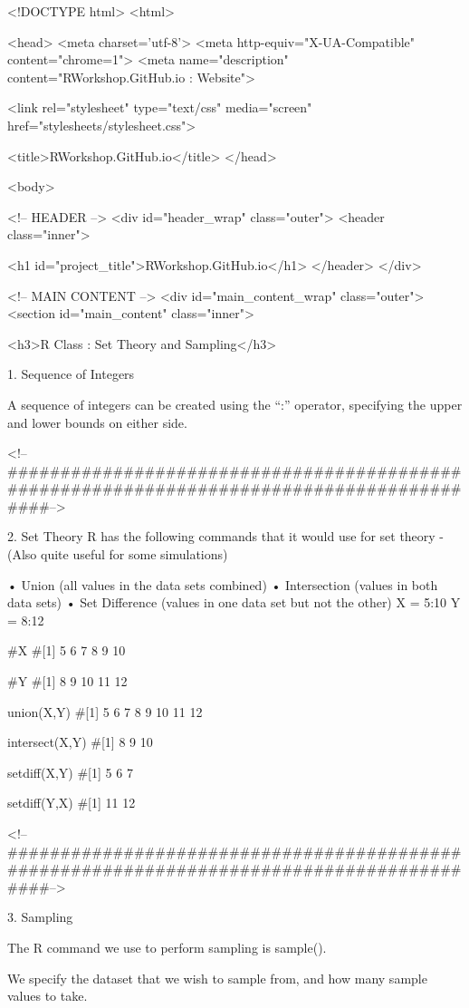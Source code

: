 <!DOCTYPE html>
<html>

  <head>
    <meta charset='utf-8'>
    <meta http-equiv="X-UA-Compatible" content="chrome=1">
    <meta name="description" content="RWorkshop.GitHub.io : Website">

    <link rel="stylesheet" type="text/css" media="screen" href="stylesheets/stylesheet.css">

    <title>RWorkshop.GitHub.io</title>
  </head>

  <body>

    <!-- HEADER -->
    <div id="header_wrap" class="outer">
        <header class="inner">
          
          <h1 id="project_title">RWorkshop.GitHub.io</h1>
        </header>
    </div>

    <!-- MAIN CONTENT -->
    <div id="main_content_wrap" class="outer">
      <section id="main_content" class="inner">


<h3>R Class : Set Theory and Sampling</h3>




1. Sequence of Integers

A sequence of integers can be created using the “:” operator, specifying the upper and lower bounds on either side.

<!--##########################################################################################-->

2. Set Theory
R has the following commands that it would use for set theory  - (Also quite useful for some simulations)

•	Union	              (all values in the data sets combined)
•	Intersection       (values in both data sets)
•	Set Difference  (values in one data set but not the other)
X = 5:10
Y = 8:12

#X
#[1] 5 6 7 8 9 10

#Y
#[1] 8 9 10 11 12

union(X,Y)
#[1] 5 6 7 8 9 10 11 12

intersect(X,Y)
#[1] 8 9 10

setdiff(X,Y)
#[1] 5 6 7

setdiff(Y,X)
#[1] 11 12

<!--##########################################################################################-->

3. Sampling

The R command we use to perform sampling is sample().

We specify the dataset that we wish to sample from, and how many sample values to take.

